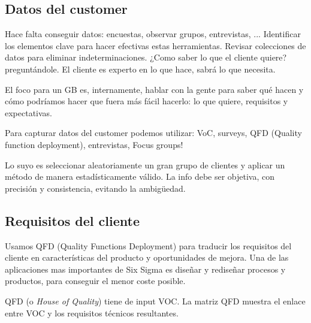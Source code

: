 \documentclass[]{article}
\begin{document}
\subsection{Datos del customer}

Hace falta conseguir datos: encuestas, observar grupos, entrevistas, ... Identificar los elementos clave para hacer efectivas estas herramientas. Revisar colecciones de datos para eliminar indeterminaciones.
¿Como saber lo que el cliente quiere? preguntándole. El cliente es experto en lo que hace, sabrá lo que necesita. 

El foco para un GB es, internamente, hablar con la gente para saber qué hacen y cómo podríamos hacer que fuera más fácil hacerlo: lo que quiere, requisitos y expectativas. 

Para capturar datos del customer podemos utilizar: VoC, surveys, QFD (Quality function deployment), entrevistas, Focus groups!

Lo suyo es seleccionar aleatoriamente un gran grupo de clientes y aplicar un método de manera estadísticamente válido. La info debe ser objetiva, con precisión y consistencia, evitando la ambigüedad. 

\subsection{Requisitos del cliente}

Usamos QFD (Quality Functions Deployment) para traducir los requisitos del cliente en características del producto y oportunidades de mejora. Una de las aplicaciones mas importantes de Six Sigma es diseñar y rediseñar procesos y productos, para conseguir el menor coste posible.

QFD (o \textit{House of Quality}) tiene de input VOC. La matriz QFD muestra el enlace entre VOC y los requisitos técnicos resultantes.
\end{document}
